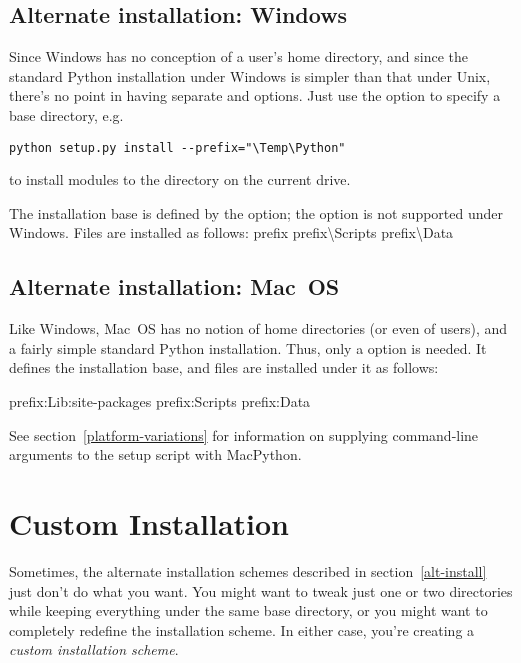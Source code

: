 \documentclass{howto}
\begin{document}
\subsection{Alternate installation: Windows}
\label{alt-install-windows}

Since Windows has no conception of a user's home directory, and since
the standard Python installation under Windows is simpler than that
under Unix, there's no point in having separate 
and  options.  Just use the 
option to specify a base directory, e.g.
\begin{verbatim}
python setup.py install --prefix="\Temp\Python"
\end{verbatim}
to install modules to the  directory on the current
drive.

The installation base is defined by the  option;
the  option is not supported under Windows.
Files are installed as follows:
              {prefix}{}
              {prefix}{\textbackslash{}Scripts}
              {prefix}{\textbackslash{}Data}


\subsection{Alternate installation: Mac~OS}
\label{alt-install-macos}

Like Windows, Mac~OS has no notion of home directories (or even of
users), and a fairly simple standard Python installation.  Thus, only a
 option is needed.  It defines the installation
base, and files are installed under it as follows:

              {prefix}{:Lib:site-packages}
              {prefix}{:Scripts}
              {prefix}{:Data}

See section~\ref{platform-variations} for information on supplying
command-line arguments to the setup script with MacPython.


\section{Custom Installation}
\label{custom-install}

Sometimes, the alternate installation schemes described in
section~\ref{alt-install} just don't do what you want.  You might
want to tweak just one or two directories while keeping everything under
the same base directory, or you might want to completely redefine the
installation scheme.  In either case, you're creating a \emph{custom
  installation scheme}.
\end{document}
